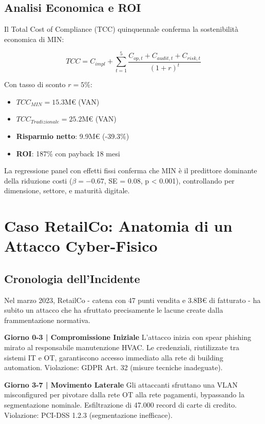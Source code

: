 \subsection{\texorpdfstring{Analisi Economica e ROI}{4.3.3 - Analisi Economica e ROI}}

Il Total Cost of Compliance (TCC) quinquennale conferma la sostenibilità economica di MIN:

\begin{equation}
TCC = C_{impl} + \sum_{t=1}^{5} \frac{C_{op,t} + C_{audit,t} + C_{risk,t}}{(1+r)^t}
\end{equation}

Con tasso di sconto $r = 5\%$:
\begin{itemize}
\item $TCC_{MIN} = 15.3$M€ (VAN)
\item $TCC_{Tradizionale} = 25.2$M€ (VAN)
\item \textbf{Risparmio netto}: 9.9M€ (-39.3\%)
\item \textbf{ROI}: 187\% con payback 18 mesi
\end{itemize}

La regressione panel con effetti fissi conferma che MIN è il predittore dominante della riduzione costi ($\beta = -0.67$, SE = 0.08, p < 0.001), controllando per dimensione, settore, e maturità digitale.

\section{\texorpdfstring{Caso RetailCo: Anatomia di un Attacco Cyber-Fisico}{4.4 - Caso RetailCo}}
\label{sec:caso_studio}

\subsection{\texorpdfstring{Cronologia dell'Incidente}{4.4.1 - Cronologia dell'Incidente}}

Nel marzo 2023, RetailCo - catena con 47 punti vendita e 3.8B€ di fatturato - ha subito un attacco che ha sfruttato precisamente le lacune create dalla frammentazione normativa.

\textbf{Giorno 0-3 | Compromissione Iniziale}
L'attacco inizia con spear phishing mirato al responsabile manutenzione HVAC. Le credenziali, riutilizzate tra sistemi IT e OT, garantiscono accesso immediato alla rete di building automation. Violazione: GDPR Art. 32 (misure tecniche inadeguate).

\textbf{Giorno 3-7 | Movimento Laterale}
Gli attaccanti sfruttano una VLAN misconfigured per pivotare dalla rete OT alla rete pagamenti, bypassando la segmentazione nominale. Esfiltrazione di 47.000 record di carte di credito. Violazione: PCI-DSS 1.2.3 (segmentazione inefficace).

